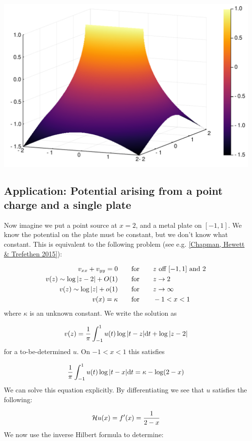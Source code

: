 \documentclass[12pt,a4paper]{article}
\def\qqfor{\qquad\hbox{for}\qquad}
\def\D{ {\rm d} }
\def\HH{ {\cal H} }
\def\dt{\D t}
\begin{document}
\includegraphics[width=\linewidth]{figures/Lecture19_5_1.pdf}

\subsection{Application: Potential arising from a point charge and a single plate}
Now imagine we put a point source at $x = 2$, and a metal plate on $[-1,1]$.  We know the potential on the plate must be constant, but we don't know what constant.  This is equivalent to the following problem (see e.g. \href{https://people.maths.ox.ac.uk/trefethen/chapman_hewett_trefethen.pdf}{[Chapman, Hewett \& Trefethen 2015]}):


\begin{align*}
v_{xx} + v_{yy} = 0 &\qqfor \hbox{$z$ off $[-1,1]$ and $2$}  \\
v(z) \sim \log |z - 2| + O(1) &\qqfor z \rightarrow 2 \\
v(z) \sim \log|z| + o(1) &\qqfor z \rightarrow \infty \\
v(x) = \kappa &\qqfor -1 < x < 1
\end{align*}
where $\kappa$ is an unknown constant.  We write the solution as

\[
v(z) = {1 \over \pi} \int_{-1}^1 u(t) \log|t-z| \dt + \log|z-2|
\]
for a to-be-determined $u$. On $-1 < x < 1$ this satisfies

\[
 {1 \over \pi} \int_{-1}^1 u(t) \log|t-x| \dt  = \kappa - \log(2-x)
\]
We can solve this equation explicitly. By differentiating we see that $u$ satisfies the following:

\[
\HH u(x) = f'(x) = {1 \over 2-x}
\]
We now use the inverse Hilbert formula to determine:
\end{document}
